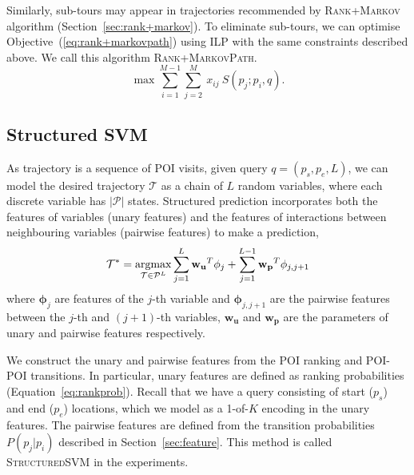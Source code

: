 Similarly,
sub-tours may appear in trajectories recommended by \textsc{Rank+Markov} algorithm (Section~\ref{sec:rank+markov}).
To eliminate sub-tours, we can optimise Objective~(\ref{eq:rank+markovpath}) using ILP with the same constraints described above.
We call this algorithm \textsc{Rank+MarkovPath}.
\begin{equation}
\label{eq:rank+markovpath}
\max \sum_{i=1}^{M-1} \sum_{j=2}^M ~x_{ij} ~S(p_j; p_i, q).
\end{equation}


\subsection{Structured SVM}
\label{sec:ssvm}
\secmoveup

As trajectory is a sequence of POI visits,
given query $q = (p_s, p_e, L)$, we can model the desired trajectory $\mathcal{T}$
as a chain of $L$ random variables, where each discrete variable has $|\mathcal{P}|$ states.
Structured prediction incorporates both the features of variables (unary features) and
the features of interactions between neighbouring variables (pairwise features) to make a
prediction,
\begin{displaymath}
    \mathcal{T}^* = \operatorname*{argmax}_{\mathcal{T} \in \mathcal{P}^L} 
                    \sum_{j=1}^L \mathbf{w_u}^T \mathbf{\phi}_j + \sum_{j=1}^{L-1} \mathbf{w_p}^T \mathbf{\phi}_{j, j+1}
\end{displaymath}
where $\mathbf{\phi}_j$ are features of the $j$-th variable and $\mathbf{\phi}_{j, j+1}$ are the pairwise features between
the $j$-th and $(j+1)$-th variables, $\mathbf{w_u}$ and $\mathbf{w_p}$ are the
parameters of unary and pairwise features respectively.

We construct the unary and pairwise features from the POI ranking and POI-POI transitions.
In particular, unary features are defined as ranking probabilities (Equation~\ref{eq:rankprob}).
Recall that we have a query consisting of start ($p_s$) and end ($p_e$) locations, 
which we model as a 1-of-$K$ encoding in the unary features.
The pairwise features are defined from the transition probabilities $P(p_j | p_i)$ described in Section~\ref{sec:feature}.
This method is called \textsc{StructuredSVM} in the experiments.

